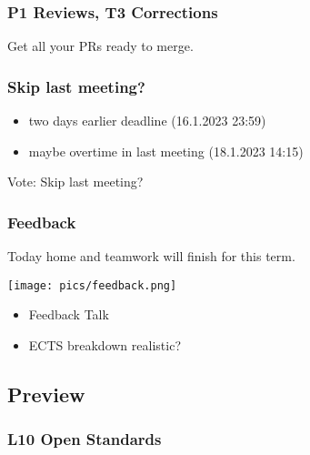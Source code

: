 \begin{frame}
	\frametitle{P1 Reviews, T3 Corrections}

	\begin{task}
	Get all your PRs ready to merge.
	\end{task}
\end{frame}

\begin{frame}
	\frametitle{Skip last meeting?}

	\begin{itemize}
	\item two days earlier deadline (16.1.2023 23:59)
	\item maybe overtime in last meeting (18.1.2023 14:15)
	\end{itemize}

	\begin{task}
	Vote: Skip last meeting?
	\end{task}
\end{frame}

\begin{frame}
	\frametitle{Feedback}
	Today home and teamwork will finish for this term.

	\hfill \texttt{[image: pics/feedback.png]}
	\vspace{-1cm}
	\begin{itemize}
		\item Feedback Talk
		\item ECTS breakdown realistic?
	\end{itemize}
\end{frame}

\subsection{Preview}

\begin{frame}
	\frametitle{L10 Open Standards}
\end{frame}

\appendix

\begin{frame}[allowframebreaks]
	
	
\end{frame}



